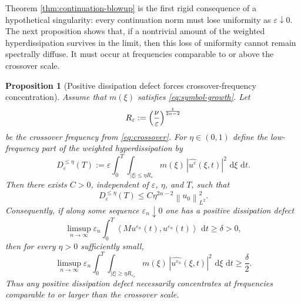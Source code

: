\documentclass[11pt]{article}
\newtheorem{proposition}[theorem]{Proposition}
\theoremstyle{definition}
\theoremstyle{remark}
\newcommand{\dd}{\,\mathrm{d}}
\newcommand{\ip}[2]{\left\langle #1,#2\right\rangle}
\newcommand{\norm}[1]{\left\lVert #1\right\rVert}
\begin{document}
Theorem \ref{thm:continuation-blowup} is the first rigid consequence of a hypothetical singularity: every continuation norm must lose uniformity as $\varepsilon\downarrow0$. The next proposition shows that, if a nontrivial amount of the weighted hyperdissipation survives in the limit, then this loss of uniformity cannot remain spectrally diffuse. It must occur at frequencies comparable to or above the crossover scale.

\begin{proposition}[Positive dissipation defect forces crossover-frequency concentration]\label{prop:defect-crossover}
Assume that $m(\xi)$ satisfies \eqref{eq:symbol-growth}. Let
\[
R_\varepsilon:=\Bigl(\frac{\nu}{\varepsilon}\Bigr)^{\frac{1}{2\alpha-2}}
\]
be the crossover frequency from \eqref{eq:crossover}. For $\eta\in(0,1)$ define the low-frequency part of the weighted hyperdissipation by
\[
D^{\le \eta}_\varepsilon(T)
:=\varepsilon\int_0^T\int_{|\xi|\le \eta R_\varepsilon} m(\xi)\,|\widehat{u^\varepsilon}(\xi,t)|^2\,\dd \xi\,\dd t.
\]
Then there exists $C>0$, independent of $\varepsilon$, $\eta$, and $T$, such that
\begin{equation}\label{eq:low-freq-defect}
D^{\le \eta}_\varepsilon(T)
\le C\eta^{2\alpha-2}\norm{u_0}_{L^2}^2.
\end{equation}
Consequently, if along some sequence $\varepsilon_n\downarrow0$ one has a positive dissipation defect
\begin{equation}\label{eq:defect-positive}
\limsup_{n\to\infty}\varepsilon_n\int_0^T\ip{M u^{\varepsilon_n}(t)}{u^{\varepsilon_n}(t)}\,\dd t\ge \delta>0,
\end{equation}
then for every $\eta>0$ sufficiently small,
\begin{equation}\label{eq:crossover-concentration}
\limsup_{n\to\infty}
\varepsilon_n\int_0^T\int_{|\xi|\ge \eta R_{\varepsilon_n}} m(\xi)\,|\widehat{u^{\varepsilon_n}}(\xi,t)|^2\,\dd \xi\,\dd t
\ge \frac{\delta}{2}.
\end{equation}
Thus any positive dissipation defect necessarily concentrates at frequencies comparable to or larger than the crossover scale.
\end{proposition}
\end{document}
